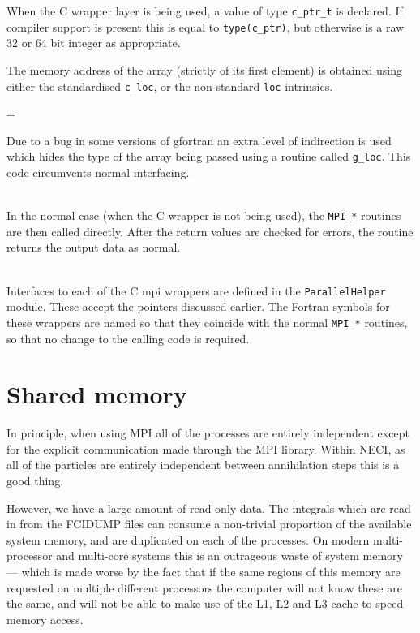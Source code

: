 \documentclass[a4paper,notitlepage]{scrreprt}
\newcommand\headitem[1]{\needspace{1.5\baselineskip}\item[{\boldmath #1 \nopagebreak}] \hfill \\ \nopagebreak}
\let\code\lstinline
\newenvironment{warningbox}
	{\par\begin{mdframed}[%
		linewidth = 2pt, %
	    linecolor = red, %
	    roundcorner = 6pt, %
		backgroundcolor = gray!20
	]\begin{list}{}{\leftmargin=1cm
			           \labelwidth=\leftmargin}\item[\Large\ding{43}]}
	{\end{list}\end{mdframed}\par}
\begin{document}
{{{\begin{description}
			When the C wrapper layer is being used, a value of type
			\code{c_ptr_t} is declared. If compiler support is
			present this is equal to \code{type(c_ptr)}, but otherwise
			is a raw 32 or 64 bit integer as appropriate.
			
			The memory address of the array (strictly of its first
			element) is obtained using either the standardised
			\code{c_loc}, or the non-standard \code{loc}
			intrinsics.
			
			\begin{warningbox}
			Due to a bug in some versions of gfortran an
			extra level of indirection is used which hides the type
			of the array being passed using a routine called
			\code{g_loc}. This code circumvents normal interfacing.
			\end{warningbox}
			
		\headitem{Calls to MPI}
			In the normal case (when the C-wrapper is not being
			used), the \code{MPI_*} routines are then called directly.
			After the return values are checked for errors, the
			routine returns the output data as normal.
					
		\headitem{C wrapper layer}
			Interfaces to each of the C mpi wrappers are defined in
			the \code{ParallelHelper} module. These accept the
			pointers discussed earlier. The Fortran symbols for these
			wrappers are named so that they coincide with the normal
			\code{MPI_*} routines, so that no change to the calling
			code is required.
		
	\end{description}

\section{Shared memory}
	In principle, when using MPI all of the processes are entirely independent
	except for the explicit communication made through the MPI library. Within
	NECI, as all of the particles are entirely independent between annihilation
	steps this is a good thing.
	
	However, we have a large amount of read-only data. The integrals which are
	read in from the FCIDUMP files can consume a non-trivial proportion of the
	available system memory, and are duplicated on each of the processes. On
	modern multi-processor and multi-core systems this is an outrageous waste
	of system memory --- which is made worse by the fact that if the same
	regions of this memory are requested on multiple different processors the
	computer will not know these are the same, and will not be able to make use
	of the L1, L2 and L3 cache to speed memory access.
	
}}}
\end{document}
